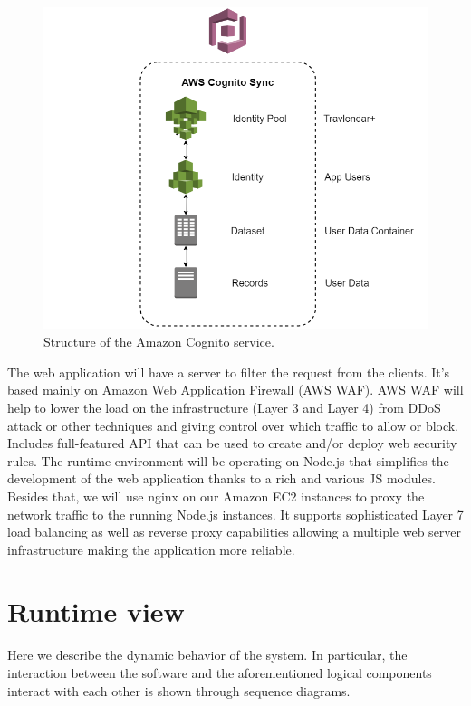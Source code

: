 \begin{figure}
	\centering
	\includegraphics[width=6in]{./diagrams/CognitoDiagram.png}
	\caption{Structure of the Amazon Cognito service.}
	\label{fig:seqCognito}
\end{figure}

The web application will have a server to filter the request from the clients. 
It's based mainly on Amazon Web Application Firewall (AWS WAF).
AWS WAF will help to lower the load on the infrastructure (Layer 3 and Layer 4) from DDoS attack or other techniques and giving control over which traffic to allow or block. 
Includes full-featured API that can be used to create and/or deploy web security rules.
The runtime environment will be operating on Node.js that simplifies the development of the web application thanks to a rich and various JS modules. 
Besides that, we will use nginx on our Amazon EC2 instances to proxy the network traffic to the running Node.js instances.
It supports sophisticated Layer 7 load balancing as well as reverse proxy capabilities allowing a multiple web server infrastructure making the application more reliable.

\section{Runtime view}
\label{sec:runtime_view}
Here we describe the dynamic behavior of the system. In particular, the interaction between the software and the aforementioned logical components interact with each other is shown through sequence diagrams.

